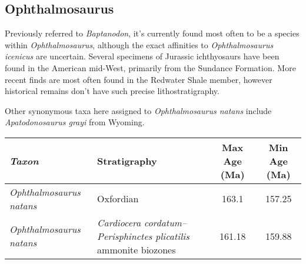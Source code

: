 \documentclass[british]{article}
\begin{document}
\subsection{Ophthalmosaurus}%
\label{sub:ophthalmosaurus}

Previously referred to \emph{Baptanodon}, it’s currently found most often to be
a species within \emph{Ophthalmosaurus}, although the exact affinities to
\emph{Ophthalmosaurus icenicus} are uncertain. Several specimens of Jurassic
ichthyosaurs have been found in the American mid-West, primarily from the
Sundance Formation. More recent finds are most often found in the Redwater Shale
member, however historical remains don’t have such precise lithostratigraphy.

Other synonymous taxa here assigned to \emph{Ophthalmosaurus natans} include
\emph{Apatodonosaurus grayi} from Wyoming.\autocite{Mehl1928JSLDUG}

\begin{table}[htb]
    \footnotesize
    {
    \begin{tabu}{>{\em}lXSS}
        \toprule
        Taxon                  & Stratigraphy & {Max Age (Ma)} & {Min Age (Ma)} \\
        \midrule
        Ophthalmosaurus natans & Oxfordian & 163.1 & 157.25 \\
        Ophthalmosaurus natans & \emph{Cardiocera cordatum–Perisphinctes plicatilis} ammonite biozones & 161.18 & 159.88 \\
        \bottomrule
    \end{tabu}}
\end{table}


\printbibliography
    
\end{document}
